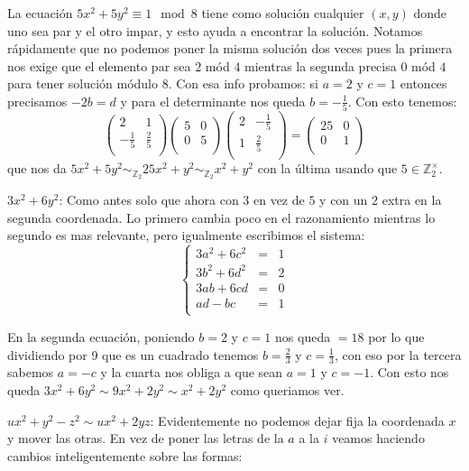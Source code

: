 \documentclass[12pt]{amsart}
\newcommand{\ZZ}{\mathbb{Z}}
\newcommand{\lp}{\left(}
\newcommand{\rp}{\right)}
\theoremstyle{plain}
\begin{document}
La ecuación $5x^2+5y^2\equiv 1\mod 8$ tiene como solución cualquier
$(x,y)$ donde uno sea par y el otro impar, y esto ayuda a encontrar 
la solución. Notamos rápidamente que no podemos poner la misma 
solución dos veces pues la primera nos exige que el elemento par sea
$2$ mód $4$ mientras la segunda precisa $0$ mód $4$ para tener solución 
módulo 8. Con esa info probamos: si $a=2$ y $c=1$ entonces 
precisamos $-2b=d$ y para el determinante nos queda $b=-\frac{1}{5}$.
Con esto tenemos:
$$\lp\begin{matrix}
    2&1 \\
    -\frac{1}{5}&\frac{2}{5} \\
\end{matrix}\rp
\lp\begin{matrix}
    5&0 \\
    0&5 \\
\end{matrix}\rp
\lp\begin{matrix}
    2&-\frac{1}{5} \\
    1&\frac{2}{5} \\
\end{matrix}\rp = 
\lp\begin{matrix}
    25&0 \\
    0&1 \\
\end{matrix}\rp$$
que nos da $5x^2+5y^2\sim_{\ZZ_2} 25x^2+y^2 \sim_{\ZZ_2} x^2+y^2$ 
con la última usando que $5\in \ZZ_2^\times$.

$3x^2+6y^2$: Como antes solo que ahora con $3$ en vez de $5$ y con un 
$2$ extra en la segunda coordenada. Lo primero cambia poco en el 
razonamiento mientras lo segundo es mas relevante, pero igualmente 
escribimos el sistema:
$$\left\{
\begin{matrix}
    3a^2+6c^2 &=&1 \\
    3b^2+6d^2 &=&2 \\
    3ab+6cd &=&0 \\
    ad-bc &=&1 \\
\end{matrix}\right.$$

En la segunda ecuación, poniendo $b=2$ y $c=1$ nos queda $=18$ por 
lo que dividiendo por 9 que es un cuadrado tenemos $b=\frac{2}{3}$
y $c=\frac{1}{3}$, con eso por la tercera sabemos $a=-c$ y la cuarta 
nos obliga a que sean $a=1$ y $c=-1$. Con esto nos queda $3x^2+6y^2
\sim 9x^2+2y^2\sim x^2+2y^2$ como queriamos ver.

$ux^2+y^2-z^2\sim ux^2+2yz$: Evidentemente no podemos dejar fija la
coordenada $x$ y mover las otras. En vez de poner las letras de la $a$
a la $i$ veamos haciendo cambios inteligentemente sobre las formas:
\end{document}
